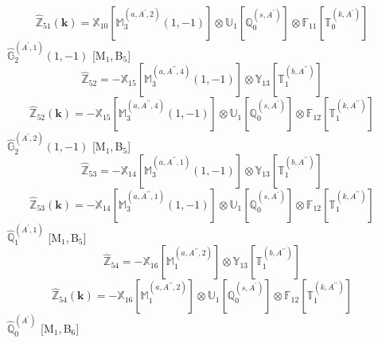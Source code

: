 \documentclass[fleqn,10pt,landscape]{article}
\begin{document}
\begin{itemize}
\begin{dmath*}
\end{dmath*}
\begin{dmath*}
\hat{\mathbb{Z}}_{51}(\bm{k})=\mathbb{X}_{10}[\mathbb{M}_{3}^{(a,A^{\prime},2)}(1,-1)] \otimes\mathbb{U}_{1}[\mathbb{Q}_{0}^{(s,A^{\prime})}] \otimes\mathbb{F}_{11}[\mathbb{T}_{0}^{(k,A^{\prime})}]
\end{dmath*}
\vspace{4mm}
\noindent {} $\,\,\,\hat{\mathbb{G}}_{2}^{(A^{\prime},1)}(1,-1)$ [M$_{1}$,\,B$_{5}$]
\begin{dmath*}
\hat{\mathbb{Z}}_{52}=- \mathbb{X}_{15}[\mathbb{M}_{3}^{(a,A^{\prime\prime},4)}(1,-1)] \otimes\mathbb{Y}_{13}[\mathbb{T}_{1}^{(b,A^{\prime\prime})}]
\end{dmath*}
\begin{dmath*}
\hat{\mathbb{Z}}_{52}(\bm{k})=- \mathbb{X}_{15}[\mathbb{M}_{3}^{(a,A^{\prime\prime},4)}(1,-1)] \otimes\mathbb{U}_{1}[\mathbb{Q}_{0}^{(s,A^{\prime})}] \otimes\mathbb{F}_{12}[\mathbb{T}_{1}^{(k,A^{\prime\prime})}]
\end{dmath*}
\vspace{4mm}
\noindent {} $\,\,\,\hat{\mathbb{G}}_{2}^{(A^{\prime},2)}(1,-1)$ [M$_{1}$,\,B$_{5}$]
\begin{dmath*}
\hat{\mathbb{Z}}_{53}=- \mathbb{X}_{14}[\mathbb{M}_{3}^{(a,A^{\prime\prime},1)}(1,-1)] \otimes\mathbb{Y}_{13}[\mathbb{T}_{1}^{(b,A^{\prime\prime})}]
\end{dmath*}
\begin{dmath*}
\hat{\mathbb{Z}}_{53}(\bm{k})=- \mathbb{X}_{14}[\mathbb{M}_{3}^{(a,A^{\prime\prime},1)}(1,-1)] \otimes\mathbb{U}_{1}[\mathbb{Q}_{0}^{(s,A^{\prime})}] \otimes\mathbb{F}_{12}[\mathbb{T}_{1}^{(k,A^{\prime\prime})}]
\end{dmath*}
\vspace{4mm}
\noindent {} $\,\,\,\hat{\mathbb{Q}}_{1}^{(A^{\prime},1)}$ [M$_{1}$,\,B$_{5}$]
\begin{dmath*}
\hat{\mathbb{Z}}_{54}=- \mathbb{X}_{16}[\mathbb{M}_{1}^{(a,A^{\prime\prime},2)}] \otimes\mathbb{Y}_{13}[\mathbb{T}_{1}^{(b,A^{\prime\prime})}]
\end{dmath*}
\begin{dmath*}
\hat{\mathbb{Z}}_{54}(\bm{k})=- \mathbb{X}_{16}[\mathbb{M}_{1}^{(a,A^{\prime\prime},2)}] \otimes\mathbb{U}_{1}[\mathbb{Q}_{0}^{(s,A^{\prime})}] \otimes\mathbb{F}_{12}[\mathbb{T}_{1}^{(k,A^{\prime\prime})}]
\end{dmath*}
\vspace{4mm}
\noindent {} $\,\,\,\hat{\mathbb{Q}}_{0}^{(A^{\prime})}$ [M$_{1}$,\,B$_{6}$]

\end{itemize}
\end{document}
